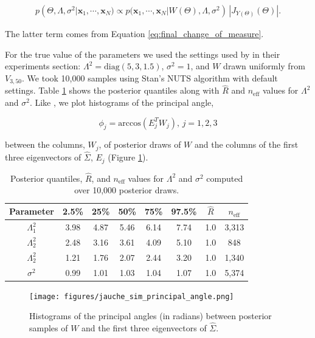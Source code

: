 \documentclass[ba]{imsart}
\newcommand{\mb}[1]{\mathbf{#1}}
\numberwithin{equation}{section}
\theoremstyle{plain}
\begin{document}
\begin{eqnarray}
\label{eq:ppca_density_givens}
p(\Theta, \Lambda, \sigma^2 | \mb{x}_1, \cdots, \mb{x}_N) \propto p(\mb{x}_1, \cdots, \mb{x}_N | W(\Theta), \Lambda, \sigma^2)\, |J_{Y(\Theta)}(\Theta)|.
\end{eqnarray}

\noindent The latter term comes from Equation \ref{eq:final_change_of_measure}.

\noindent For the true value of the parameters we used the settings used by \citet{jauch2018random} in their experiments section: $\Lambda^2 = \mathrm{diag}(5, 3, 1.5)$, $\sigma^2 = 1$, and $W$ drawn uniformly from $V_{3, 50}$. We took 10,000 samples using Stan's NUTS algorithm with default settings. Table \ref{tab:ppca50} shows the posterior quantiles along with $\hat{R}$ and $n_{\mathrm{eff}}$ values for $\Lambda^2$ and $\sigma^2$. Like \citet{jauch2018random}, we plot histograms of the principal angle,

\begin{equation}
\phi_j = \mathrm{arccos}(E_j^T W_j),\, j=1,2,3
\end{equation}

\noindent between the columns, $W_j$, of posterior draws of $W$ and the columns of the first three eigenvectors of $\hat{\Sigma}$, $E_j$ (Figure \ref{fig:ppca50_principal_angle}).

\begin{table}
\begin{tabular}{|c||ccccccc|}
\hline
Parameter & 2.5\% & 25\% & 50\% & 75\% & 97.5\% &  $\hat{R}$ & $n_{\mathrm{eff}}$\\
\hline
\hline
$\Lambda_1^2$  & 3.98 & 4.87 & 5.46 & 6.14 & 7.74 & 1.0 & 3,313\\
$\Lambda_2^2$  & 2.48 & 3.16 & 3.61 & 4.09 & 5.10 & 1.0 & 848\\
$\Lambda_2^2$  & 1.21 & 1.76 & 2.07 & 2.44 & 3.20 & 1.0 & 1,340 \\
$\sigma^2$ & 0.99 & 1.01 & 1.03 & 1.04 & 1.07 & 1.0 & 5,374\\
\hline
\end{tabular}
\caption{Posterior quantiles, $\hat{R}$, and $n_{\mathrm{eff}}$ values for $\Lambda^2$ and $\sigma^2$ computed over 10,000 posterior draws.}
\label{tab:ppca50}
\end{table}

\begin{figure}[h]
\centering
\vspace{.1in}
\texttt{[image: figures/jauche\_sim\_principal\_angle.png]}
\vspace{.05in}
\caption{Histograms of the principal angles (in radians) between posterior samples of $W$ and the first three eigenvectors of $\hat{\Sigma}$.}
\label{fig:ppca50_principal_angle}
\end{figure}
\end{document}
